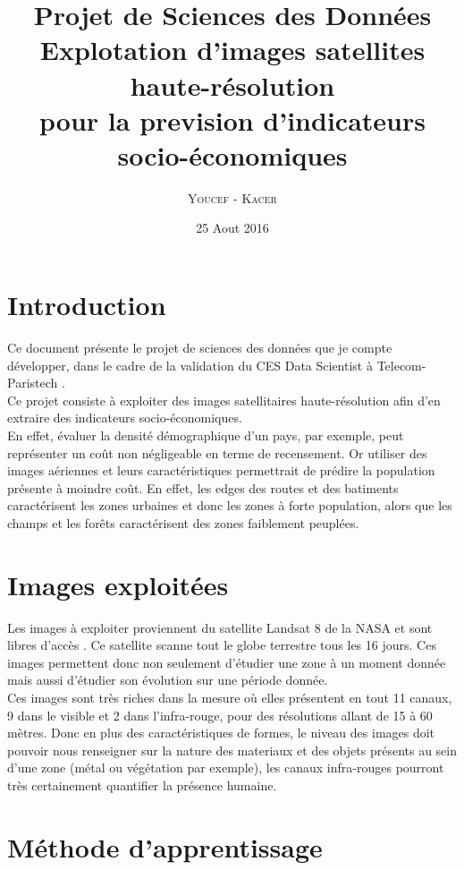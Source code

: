 \documentclass{book}
\title{%
  Projet de Sciences des Données \\
  \large Explotation d'images satellites haute-résolution \\pour la prevision d'indicateurs socio-économiques \\
    }
\author{\textsc{Youcef} - \textsc{Kacer}}
\date{25 Aout 2016}
\begin{document}
 
\maketitle

\tableofcontents

\frontmatter
\chapter{Introduction}
Ce document présente le projet de sciences des données que je compte développer, dans le cadre de la validation du CES Data Scientist à Telecom-Paristech \cite{cesds}.\\
Ce projet consiste à exploiter des images satellitaires haute-résolution afin d'en extraire des indicateurs socio-économiques.\\
En effet, évaluer la densité démographique d'un pays, par exemple, peut représenter un co\^{u}t non négligeable en terme de 
recensement. Or utiliser des images aériennes et leurs caractéristiques permettrait de prédire la population présente à moindre co\^{u}t.
En effet, les \og edges \fg des routes et des batiments caractérisent les zones urbaines et donc les zones à forte population, alors que
les champs et les for\^{e}ts caractérisent des zones faiblement peuplées.\\

\mainmatter
\chapter{Images exploitées}

Les images à exploiter proviennent du satellite Landsat 8 de la NASA et sont libres d'accès \cite{landsat8}. Ce satellite scanne tout le globe terrestre 
tous les 16 jours. Ces images permettent donc non seulement d'étudier une zone à un moment donnée mais aussi d'étudier son évolution sur
une période donnée.\\
Ces images sont très riches dans la mesure où elles présentent en tout 11 canaux, 9 dans le visible et 2 dans l'infra-rouge, pour des résolutions 
allant de 15 à 60 mètres. Donc en plus des caractéristiques de formes, le niveau des images doit pouvoir nous renseigner sur 
la nature des materiaux et des objets présents au sein d'une zone (métal ou végétation par exemple), les canaux infra-rouges pourront très certainement
quantifier la présence humaine.\\

\chapter{Méthode d'apprentissage}
\end{document}
